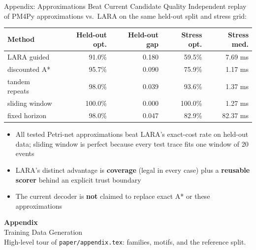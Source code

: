 \documentclass[aspectratio=169]{beamer}
\newcommand{\keyc}[1]{\textbf{\textcolor{larablue}{#1}}}
\newcommand{\keyg}[1]{\textbf{\textcolor{laraaqua!70!black}{#1}}}
\newcommand{\keya}[1]{\textbf{\textcolor{laraamber!85!black}{#1}}}
\begin{document}
\begin{frame}{Appendix: Approximations Beat Current Candidate Quality}
  Independent replay of PM4Py approximations vs.\ LARA on the same
  held-out split and stress grid:
  \vspace{2mm}
  \begin{center}
  \small
  \begin{tabular}{lrrrr}
    \toprule
    Method & Held-out opt. & Held-out gap & Stress opt. & Stress med. \\
    \midrule
    LARA guided & 91.0\% & 0.180 & 59.5\% & 7.69 ms \\
    discounted A* & 95.7\% & 0.090 & 75.9\% & 1.17 ms \\
    tandem repeats & 98.0\% & 0.039 & 93.6\% & 1.37 ms \\
    sliding window & 100.0\% & 0.000 & 100.0\% & 1.27 ms \\
    fixed horizon & 98.0\% & 0.047 & 82.9\% & 82.37 ms \\
    \bottomrule
  \end{tabular}
  \end{center}
  \vspace{3mm}
  \begin{itemize}\setlength{\itemsep}{5pt}
    \item All tested Petri-net approximations beat LARA's exact-cost rate
      on held-out data; sliding window is perfect because every test
      trace fits one window of 20 events
    \item LARA's distinct advantage is \keyc{coverage} (legal in every case)
      plus a \keyg{reusable scorer} behind an explicit trust boundary
    \item The current decoder is \keya{not} claimed to replace exact A*
      or these approximations
  \end{itemize}
\end{frame}

\begin{frame}
  \centering
  {\LARGE \textbf{\textcolor{larablue}{Appendix}}}\\[3mm]
  {\large Training Data Generation}\\[5mm]
  \small High-level tour of \texttt{paper/appendix.tex}:
  families, motifs, and the reference split.
\end{frame}
\end{document}
